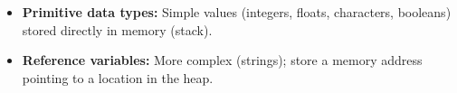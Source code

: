 \documentclass{article}
\begin{document}
\begin{itemize}
    \item \textbf{Primitive data types:} Simple values (integers, floats, characters, booleans) stored directly in memory (stack).
    \item \textbf{Reference variables:} More complex (strings); store a memory address pointing to a location in the heap.
\end{itemize}
\end{document}

